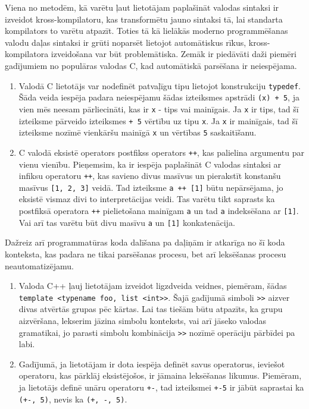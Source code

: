 Viena no metodēm, kā varētu ļaut lietotājam paplašināt valodas sintaksi ir izveidot kross-kompilatoru, kas transformētu jauno sintaksi tā, lai standarta kompilators to varētu atpazīt. Toties tā kā lielākās moderno programmēšanas valodu daļas sintaksi ir grūti noparsēt lietojot automātiskus rīkus, kross-kompilatora izveidošana var būt problemātiska. Zemāk ir piedāvāti daži piemēri gadījumiem no populāras valodas C, kad automātiskā parsēšana ir neiespējama.

\begin{enumerate}
\item
Valodā C lietotājs var nodefinēt patvaļīgu tipu lietojot konstrukciju \verb|typedef|. Šāda veida iespēja padara neiespējamu šādas izteiksmes apstrādi \verb|(x) + 5|, ja vien mēs neesam pārliecināti, kas ir \verb|x| - tips vai mainīgais. Ja \verb|x| ir tips, tad šī izteiksme pārveido izteiksmes \verb|+ 5| vērtību uz tipu \verb|x|. Ja \verb|x| ir mainīgais, tad šī izteiksme nozīmē vienkāršu mainīgā \verb|x| un vērtības \verb|5| saskaitīšanu. 
\item
C valodā eksistē operators postfikss operators \verb|++|, kas palielina argumentu par vienu vienību. Pieņemsim, ka ir iespēja paplašināt C valodas sintaksi ar infiksu operatoru \verb|++|, kas savieno divus masīvus un pierakstīt konstanšu masīvus \verb|[1, 2, 3]| veidā. Tad izteiksme \verb|a ++ [1]| būtu nepārsējama, jo eksistē vismaz divi to interpretācijas veidi. Tas varētu tikt saprasts ka postfiksā operatora \verb|++| pielietošana mainīgam \verb|a| un tad \verb|a| indeksēšana ar \verb|[1]|. Vai arī tas varētu būt divu masīvu \verb|a| un \verb|[1]| konkatenācija.
\end{enumerate}

Dažreiz arī programmatūras koda dalīšana pa daļiņām ir atkarīga no šī koda konteksta, kas padara ne tikai parsēšanas procesu, bet arī leksēšanas procesu neautomatizējamu.

\begin{enumerate}
\item
Valoda C++ ļauj lietotājam izveidot ligzdveida veidnes, piemēram, šādas \verb|template <typename foo, list <int>>|. Šajā gadījumā simboli \verb|>>| aizver divas atvērtās grupas pēc kārtas. Lai tas tiešām būtu atpazīts, ka grupu aizvēršana, lekserim jāzina simbolu konteksts, vai arī jāseko valodas gramatikai, jo parasti simbolu kombinācija \verb|>>| nozīmē operāciju pārbīdei pa labi.
\item
Gadījumā, ja lietotājam ir dota iespēja definēt savus operatorus, ieviešot operatoru, kas pārklāj eksistējošos, ir jāmaina leksēšanas likumus. Piemēram, ja lietotājs definē unāru operatoru \verb|+-|, tad izteiksmei \verb|+-5| ir jābūt saprastai ka \verb|(+-, 5)|, nevis ka \verb|(+, -, 5)|.
\end{enumerate}

